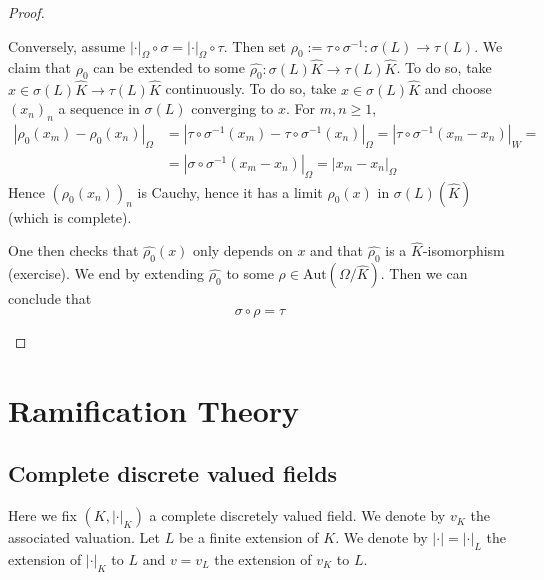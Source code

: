 \begin{proof}{}
\begin{enumerate}[label = \arabic*.]
        Conversely, assume \(|\cdot |_\Omega \circ \sigma = |\cdot |_\Omega
        \circ \tau\). Then set \(\rho_0 := \tau \circ \sigma^{-1} : \sigma {(L)}
        \to \tau {(L)}\). We claim that \(\rho_{0}\) can be extended to some
        \(\widehat{\rho_{0}} : \sigma{(L)} \widehat{K} \to \tau{(L)}
        \widehat{K}\). To do so, take \(x \in \sigma{(L)}\widehat{K} \to \tau
        {(L)} \widehat{K}\) continuously.
        To do so, take \(x \in \sigma{(L)}\widehat{K}\) and choose
        \({(x_{n})}_n\) a sequence in \(\sigma{(L)}\) converging to \(x\). For
        \(m, n \ge 1\), 
        \begin{align*}
            |\rho_{0}{(x_{m})} - \rho_{0}{(x_{n})}|_{\Omega} &= |\tau \circ
            \sigma^{-1}{(x_{m})} - \tau \circ \sigma^{-1}{(x_{n})}|_\Omega =
            |\tau \circ \sigma^{-1}{(x_{m} - x_{n})}|_{W} = \\
             &= |\sigma \circ \sigma^{-1} {(x_{m} - x_{n})} |_\Omega = |x_{m} -
             x_{n}|_\Omega
        \end{align*}
        Hence \({(\rho_{0}{(x_{n})})}_n\) is Cauchy, hence it has a limit
        \(\rho_{0}{(x)}\) in \(\sigma{(L)}{(\widehat{K})}\) (which is complete).

        One then checks that \(\widehat{\rho_{0}}{(x)}\) only depends on \(x\)
        and that \(\widehat{\rho_{0}}\) is a \(\widehat{K}\)-isomorphism
        (exercise). We end by extending \(\widehat{\rho_{0}}\) to some \(\rho
        \in \mathrm{Aut}{(\Omega / \widehat{K})}\). Then we can conclude that
        \[
          \sigma \circ \rho = \tau
        \]
    
\end{enumerate}

\end{proof}

\section{Ramification Theory}
\subsection{Complete discrete valued fields}

Here we fix \({(K, |\cdot |_K)}\) a complete discretely valued field. We denote
by \(v_K\) the associated valuation. Let \(L\) be a finite extension of \(K\).
We denote by \(|\cdot | = |\cdot |_L\) the extension of \(|\cdot |_K\) to \(L\)
and \(v = v_L\) the extension of \(v_K\) to \(L\).


